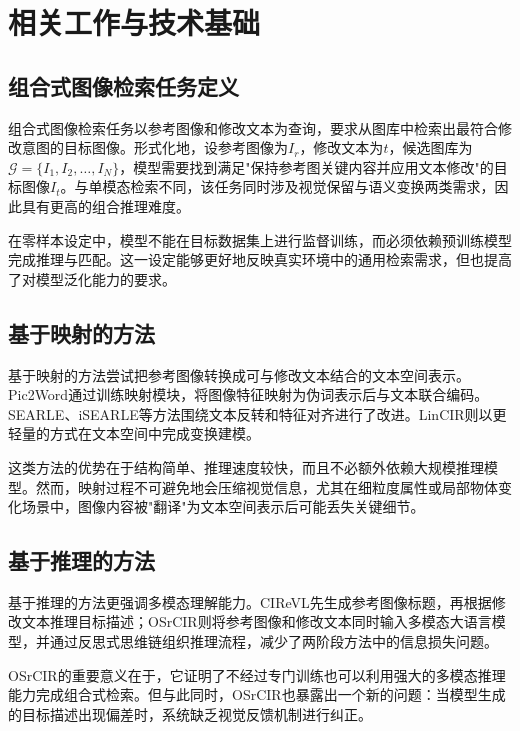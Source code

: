 \documentclass[12pt,a4paper,UTF8,oneside,openany]{ctexrep}
\begin{document}
\chapter{相关工作与技术基础}

\section{组合式图像检索任务定义}

组合式图像检索任务以参考图像和修改文本为查询，要求从图库中检索出最符合修改意图的目标图像。形式化地，设参考图像为$I_r$，修改文本为$t$，候选图库为$\mathcal{G}=\{I_1,I_2,\ldots,I_N\}$，模型需要找到满足"保持参考图关键内容并应用文本修改"的目标图像$I_t$。与单模态检索不同，该任务同时涉及视觉保留与语义变换两类需求，因此具有更高的组合推理难度。

在零样本设定中，模型不能在目标数据集上进行监督训练，而必须依赖预训练模型完成推理与匹配。这一设定能够更好地反映真实环境中的通用检索需求，但也提高了对模型泛化能力的要求。

\section{基于映射的方法}

基于映射的方法尝试把参考图像转换成可与修改文本结合的文本空间表示。Pic2Word\cite{saito2023pic2word}通过训练映射模块，将图像特征映射为伪词表示后与文本联合编码。SEARLE\cite{baldrati2023zero}、iSEARLE\cite{baldrati2025isearle}等方法围绕文本反转和特征对齐进行了改进。LinCIR\cite{gu2024lincir}则以更轻量的方式在文本空间中完成变换建模。

这类方法的优势在于结构简单、推理速度较快，而且不必额外依赖大规模推理模型。然而，映射过程不可避免地会压缩视觉信息，尤其在细粒度属性或局部物体变化场景中，图像内容被"翻译"为文本空间表示后可能丢失关键细节。

\section{基于推理的方法}

基于推理的方法更强调多模态理解能力。CIReVL\cite{karthik2024vision}先生成参考图像标题，再根据修改文本推理目标描述；OSrCIR\cite{tang2025reason}则将参考图像和修改文本同时输入多模态大语言模型，并通过反思式思维链组织推理流程，减少了两阶段方法中的信息损失问题。

OSrCIR的重要意义在于，它证明了不经过专门训练也可以利用强大的多模态推理能力完成组合式检索。但与此同时，OSrCIR也暴露出一个新的问题：当模型生成的目标描述出现偏差时，系统缺乏视觉反馈机制进行纠正。
\end{document}
